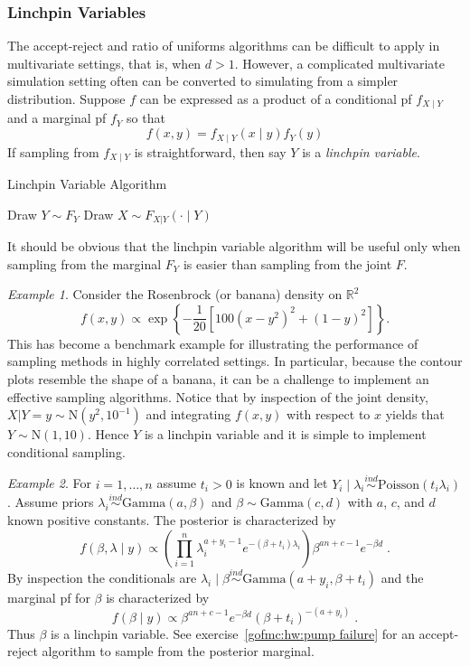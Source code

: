 \documentclass[12pt]{article}
\theoremstyle{plain}
\theoremstyle{definition}
\theoremstyle{remark}
\newtheorem{example}{Example}[section]
\begin{document}
\subsubsection{Linchpin Variables}
\label{gofmc:sec:linchpin variables}

The accept-reject and ratio of uniforms algorithms can be difficult to
apply in multivariate settings, that is, when $d > 1$. However, a
complicated multivariate simulation setting often can be converted to
simulating from a simpler distribution.  Suppose $f$ can be expressed
as a product of a conditional pf $f_{X \mid Y}$ and a marginal pf
$f_{Y}$ so that
\[
f(x, y) = f_{X \mid Y}(x\mid y) f_{Y}(y)
\]
If sampling from $f_{X \mid Y}$ is straightforward, then say $Y$ is a
{\em linchpin variable}.

\begin{algorithm}[H]
 \caption{Linchpin Variable Algorithm} \label{gofmc:alg:lv}
 \begin{algorithmic}[1]
   \State Draw $Y \sim F_Y$ 
   \State Draw $X \sim F_{X|Y}(\cdot \mid Y)$
 \end{algorithmic}
\end{algorithm}

It should be obvious that the linchpin variable algorithm will be
useful only when sampling from the marginal $F_Y$ is easier than
sampling from the joint $F$.

\begin{example}
	\label{ex:rosenbrock}
	Consider the Rosenbrock (or banana) density on $\mathbb{R}^{2}$
	\[
	f(x,y) \propto \exp\left\{ - \frac{1}{20} \left[ 100(x - y^2)^{2} +
	(1-y)^{2} \right]\right\}.
	\]
	This has become a benchmark example for illustrating the
	performance of sampling methods in highly correlated settings.  In
	particular, because the contour plots resemble the shape of a banana,
	it can be a challenge to implement an effective sampling algorithms. Notice
	that by inspection of the joint density,
	$X|Y=y \sim \text{N}(y^{2}, 10^{-1})$ and integrating $f(x,y)$ with
	respect to $x$ yields that $Y \sim \text{N}(1,10)$. Hence $Y$ is a
	linchpin variable and it is simple to implement conditional sampling.
\end{example}

\begin{example}
\label{gofmc:ex:pump failure}
For $i=1, \ldots, n$ assume $t_i > 0$ is known and let
$Y_{i} \mid \lambda_i \stackrel{ind}{\sim} \text{Poisson}(t_i
\lambda_i)$.  Assume priors
$\lambda_i \stackrel{ind}{\sim} \text{Gamma}(a, \beta)$ and
$\beta \sim \text{Gamma}(c, d)$ with $a$, $c$, and $d$ known positive
constants. The posterior is characterized by
$$
f(\beta, \lambda \mid y) \propto \left( \prod_{i=1}^{n} \lambda_{i}^{a +
    y_i - 1} e^{-(\beta+ t_i)\lambda_i}\right) \beta^{an+c-1}
e^{-\beta d} \; .
$$
By inspection the conditionals are 
$\lambda_i \mid \beta \stackrel{ind}{\sim} \text{Gamma}(a+y_i, \beta +
t_i)$ and the marginal pf for $\beta$ is characterized by
$$
f(\beta \mid y) \propto \beta^{an+c-1} e^{-\beta d} \left( \beta + t_i
\right)^{-(a+y_i)} \; .
$$
Thus $\beta$ is a linchpin variable. See exercise~\ref{gofmc:hw:pump
  failure} for an accept-reject algorithm to sample from the posterior
marginal.
\end{example}
\end{document}
